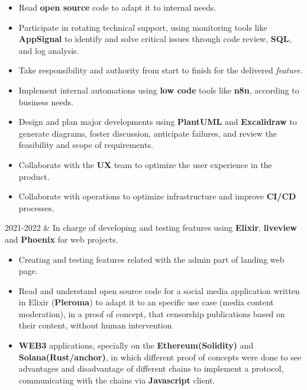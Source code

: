 \documentclass[
    changecolor={111, 156, 45}, 
]{cv-roald}
\begin{document}
\begin{tabularcv}
\begin{itemize}
\item Read \textbf{open source} code to adapt it to internal needs.
\item Participate in rotating technical support, using monitoring tools like \textbf{AppSignal} to identify and solve critical issues through code review, \textbf{SQL}, and log analysis.
\item Take responsibility and authority from start to finish for the delivered \textit{feature}.
\item Implement internal automations using \textbf{low code} tools like \textbf{n8n}, according to business needs.
\item Design and plan major developments using \textbf{PlantUML} and \textbf{Excalidraw} to generate diagrams, foster discussion, anticipate failures, and review the feasibility and scope of requirements.
\item Collaborate with the \textbf{UX} team to optimize the user experience in the product.
\item Collaborate with operations to optimize infrastructure and improve \textbf{CI/CD} processes.
\end{itemize}
\end{tabularcv}
\begin{tabularcv}
2021-2022 & 
\newline
In charge of developing and testing features using \textbf{Elixir}, \textbf{liveview} and \textbf{Phoenix} for web projects.
\begin{itemize}
    \item Creating and testing features related with the admin part of landing web page.
    \item Read and understand open source code for a social media application written in Elixir (\textbf{Pleroma}) to adapt it to an specific use case (media content moderation), in a proof of concept, that censorship publications based on their content, without human intervention
    \item \textbf{WEB3} applications, specially on the \textbf{Ethereum(Solidity)} and \textbf{Solana(Rust/anchor)}, in which different proof of concepts were done to see advantages and disadvantage of different chains to implement a protocol, communicating with the chains via \textbf{Javascript} client.
\end{itemize}
\end{tabularcv}
\end{document}
